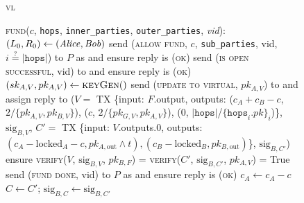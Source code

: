 \begin{figure}[H]
  \begin{systembox}{\textsc{vl}}
    \begin{algorithmic}[1]
      \State \textsc{fund}($c$, \texttt{hops}, \texttt{inner\_parties},
      \texttt{outer\_parties}, \textit{vid}):
      \Indent
        \State {}
      \EndIndent
      \Statex
        \State $(L_0, R_0) \gets (\mathit{Alice}, \mathit{Bob})$
        \label{code:functionality:chan:skeleton:virtual:fund:init}
         
        \label{code:functionality:chan:skeleton:virtual:fund:for:allow:start}
          \State send (\textsc{allow fund}, $c$, \texttt{sub\_parties}, vid, $i
          \overset{?}{=} |\mathtt{hops}|$) to $P$ as \alice and ensure reply
          is (\textsc{ok})
          \label{code:functionality:chan:skeleton:virtual:fund:for:allow:send}
        \EndFor
        \label{code:functionality:chan:skeleton:virtual:fund:for:allow:end}
          \State send (\textsc{is open successful}, vid) to \adversary and ensure
          reply is (\textsc{ok})
          \State $(sk_{A, V}, pk_{A, V}) \gets \textsc{keyGen}()$
          \State send (\textsc{update to virtual}, $pk_{A, V}$) to \adversary
          and assign reply to ($V =$ TX \{input: $F$.output, outputs: ($c_A +
          c_B - c$, $2/\{pk_{A, V}, pk_{B, V}\}$), ($c$, $2/\{pk_{G, V}, pk_{A,
          V}\}$), (0, $|\mathtt{hops}|$/$\{\mathtt{hops}_i.pk\}_i$)\},
          $\mathrm{sig}_{B, V}$, $C' =$ TX \{input: $V$.outputs.0, outputs:
          $(c_A - \mathrm{locked}_A - c, pk_{A, \mathrm{out}} \wedge t), (c_B -
          \mathrm{locked}_B, pk_{B, \mathrm{out}})$\}, $\mathrm{sig}_{B, C'}$)
          \State ensure \textsc{verify}($V$, $\mathrm{sig}_{B, V}$, $pk_{B,
          F}$) = \textsc{verify}($C'$, $\mathrm{sig}_{B, C'}$, $pk_{A, V}$) =
          True
        \EndIf
        \label{code:functionality:chan:skeleton:virtual:fund:simulate}
         
        \label{code:functionality:chan:skeleton:virtual:fund:confirm}
          \State send (\textsc{fund done}, vid) to $P$ as \alice and ensure reply
          is (\textsc{ok})
        \EndFor
        \State $c_A \gets c_A - c$
          \State $C \gets C'$; $\mathrm{sig}_{B, C} \gets \mathrm{sig}_{B, C'}$
        \EndIf


\end{algorithmic}
\end{systembox}
\end{figure}
